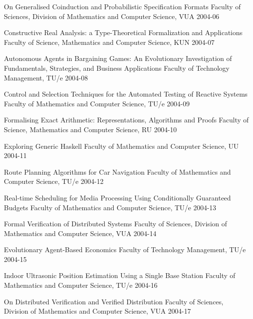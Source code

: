 \begin{multicols}{2}
     {On Generalised Coinduction and Probabilistic Specification Formats}
         {Faculty of Sciences, Division of Mathematics and Computer Science, VUA}
         {2004-06}

         {Constructive Real Analysis: a Type-Theoretical Formalization and Applications}
         {Faculty of Science, Mathematics and Computer Science, KUN}
         {2004-07}

     {Autonomous Agents in Bargaining Games: An Evolutionary Investigation of Fundamentals, Strategies, and Business Applications}
         {Faculty of Technology Management, TU/e}
         {2004-08}

     {Control and Selection Techniques for the Automated Testing of Reactive Systems}
         {Faculty of Mathematics and Computer Science, TU/e}
         {2004-09}

         {Formalising Exact Arithmetic: Representations, Algorithms and Proofs}
         {Faculty of Science, Mathematics and Computer Science, RU}
         {2004-10}

     {Exploring Generic Haskell}
     {Faculty of Mathematics and Computer Science, UU}
     {2004-11}

     {Route Planning Algorithms for Car Navigation}
         {Faculty of Mathematics and Computer Science, TU/e}
         {2004-12}

     {Real-time Scheduling for Media Processing Using Conditionally Guaranteed Budgets}
         {Faculty of Mathematics and Computer Science, TU/e}
         {2004-13}

     {Formal Verification of Distributed Systems}
         {Faculty of Sciences, Division of Mathematics and Computer Science, VUA}
         {2004-14}

     {Evolutionary Agent-Based Economics}
         {Faculty of Technology Management, TU/e}
         {2004-15}

     {Indoor Ultrasonic Position Estimation Using a Single Base Station}
         {Faculty of Mathematics and Computer Science, TU/e}
         {2004-16}


     {On Distributed Verification and Verified Distribution}
         {Faculty of Sciences, Division of Mathematics and Computer Science, VUA}
         {2004-17}


\end{multicols}
